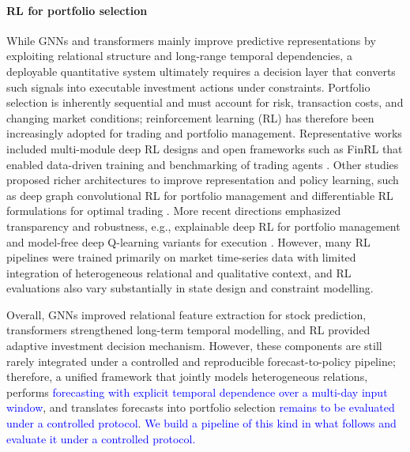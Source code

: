 \documentclass[pdflatex,sn-mathphys-num]{sn-jnl}%
\theoremstyle{thmstyleone}%
\theoremstyle{thmstyletwo}%
\theoremstyle{thmstylethree}%
\begin{document}
\paragraph{RL for portfolio selection}
While GNNs and transformers mainly improve predictive representations by exploiting relational structure and long-range temporal dependencies, a deployable quantitative system ultimately requires a decision layer that converts such signals into executable investment actions under constraints. 
Portfolio selection is inherently sequential and must account for risk, transaction costs, and changing market conditions; reinforcement learning (RL) has therefore been increasingly adopted for trading and portfolio management. 
Representative works included multi-module deep RL designs \citep{Ma2021ParallelMultiModuleDRLTrading} and open frameworks such as FinRL that enabled data-driven training and benchmarking of trading agents \citep{Liu2021FinRL}. 
Other studies proposed richer architectures to improve representation and policy learning, such as deep graph convolutional RL for portfolio management \citep{Farzan2021DeepPocket} and differentiable RL formulations for optimal trading \citep{Thibault2022DeepDifferentiableRLTrading}. 
More recent directions emphasized transparency and robustness, e.g., explainable deep RL for portfolio management \citep{Guan2021ExplainableDRLPortfolio} and model-free deep Q-learning variants for execution \citep{Brian2021DoubleDeepQLearning}.
However, many RL pipelines were trained primarily on market time-series data with limited integration of heterogeneous relational and qualitative context, and RL evaluations also vary substantially in state design and constraint modelling.

Overall, GNNs improved relational feature extraction for stock prediction, transformers strengthened long-term temporal modelling, and RL provided adaptive investment decision mechanism. 
However, these components are still rarely integrated under a controlled and reproducible forecast-to-policy pipeline; therefore, a unified framework that jointly models heterogeneous relations, performs \textcolor{blue}{forecasting with explicit temporal dependence over a multi-day input window}, and translates forecasts into portfolio selection \textcolor{blue}{remains to be evaluated under a controlled protocol}. \textcolor{blue}{We build a pipeline of this kind in what follows and evaluate it under a controlled protocol.}
\end{document}
